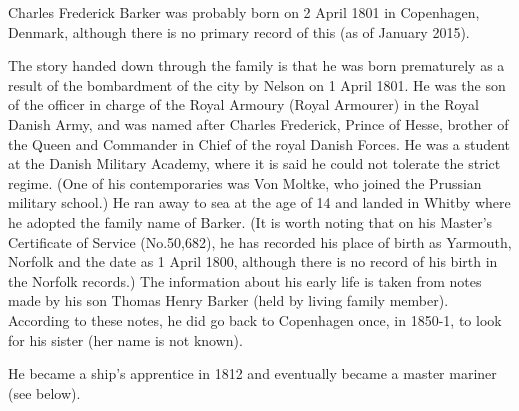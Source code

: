 
Charles Frederick Barker was probably born on 2 April 1801 in	Copenhagen, Denmark, although there is no primary record of this (as of January 2015).

The story handed down through the family is that he was born prematurely as a result of the bombardment of the city by Nelson on 1 April 1801. He was the son of the officer in charge of the Royal Armoury (Royal Armourer) in the Royal Danish Army, and was named after Charles Frederick, Prince of Hesse, brother of the Queen and Commander in Chief of the royal Danish Forces. He was a student at the Danish Military Academy, where it is said he could not tolerate the strict regime. (One of his contemporaries was Von Moltke, who joined the Prussian military school.) He ran away to sea at the age of 14 and landed in Whitby where he adopted the family name of Barker. (It is worth noting that on his Master's Certificate of Service (No.50,682), he has recorded his place of birth as Yarmouth, Norfolk and the date as 1 April 1800, although there is no record of his birth in the Norfolk records.) The information about his early life is taken from notes made by his son Thomas Henry Barker (held by living family member). According to these notes, he did go back to Copenhagen once, in 1850-1, to look for his sister (her name is not known).

He became a ship's apprentice in 1812 \cite{CFBShipList} and eventually became a master mariner (see below).

